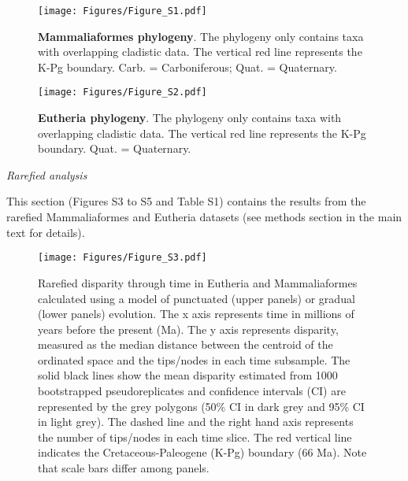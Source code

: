\documentclass[12pt,letterpaper]{article}
\renewcommand{\subsection}[1]{%
\bigskip
\begin{center}
\begin{large}
\normalfont\itshape #1
\end{large}
\end{center}}
\begin{document}
\begin{figure}[!htbp]
\centering
    \texttt{[image: Figures/Figure\_S1.pdf]}
\caption{\textbf{Mammaliaformes phylogeny}. The phylogeny only contains taxa with overlapping cladistic data. The vertical red line represents the K-Pg boundary. Carb. = Carboniferous; Quat. = Quaternary.}
\end{figure}

\begin{figure}[!htbp]
\centering
    \texttt{[image: Figures/Figure\_S2.pdf]}
\caption{\textbf{Eutheria phylogeny}. The phylogeny only contains taxa with overlapping cladistic data. The vertical red line represents the K-Pg boundary. Quat. = Quaternary.}
\end{figure}

\newpage
\subsection{Rarefied analysis}
This section (Figures S3 to S5 and Table S1) contains the results from the rarefied Mammaliaformes and Eutheria datasets (see methods section in the main text for details).

\begin{figure}[!h]
\centering
    \texttt{[image: Figures/Figure\_S3.pdf]}
\caption{\scriptsize{Rarefied disparity through time in Eutheria and Mammaliaformes calculated using a model of punctuated (upper panels) or gradual (lower panels) evolution. The x axis represents time in millions of years before the present (Ma). The y axis represents disparity, measured as the median distance between the centroid of the ordinated space and the tips/nodes in each time subsample. The solid black lines show the mean disparity estimated from 1000 bootstrapped pseudoreplicates and confidence intervals (CI) are represented by the grey polygons (50\% CI in dark grey and 95\% CI in light grey). The dashed line and the right hand axis represents the number of tips/nodes in each time slice. The red vertical line indicates the Cretaceous-Paleogene (K-Pg) boundary (66 Ma). Note that scale bars differ among panels.}}
\label{fig:Fig_Rar_results}
\end{figure}
\end{document}
